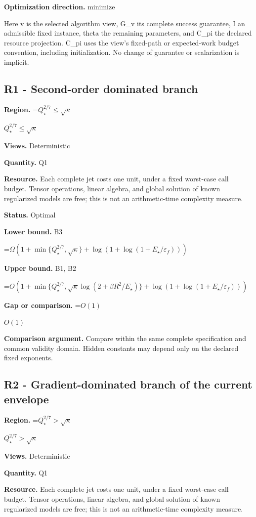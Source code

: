 \documentclass[10pt,a4paper]{article}
\newcommand{\AtlasMath}[1]{\par\begingroup\centering\setbox0=\hbox{$\displaystyle #1$}\ifdim\wd0>1.4\linewidth\typeout{ATLAS WIDE FORMULA: \the\wd0}\fi\ifdim\wd0>\linewidth\resizebox{\linewidth}{!}{\box0}\else\box0\fi\par\endgroup}
\newcommand{\AtlasInlineMath}[1]{\begingroup\setbox0=\hbox{$#1$}\ifdim\wd0>.4\linewidth\endgroup\AtlasMath{#1}\else\endgroup$#1$\fi}
\begin{document}
\textbf{Optimization direction.} minimize

Here v is the selected algorithm view, G\_v its complete success guarantee, I an admissible fixed instance, theta the remaining parameters, and C\_pi the declared resource projection. C\_pi uses the view's fixed-path or expected-work budget convention, including initialization. No change of guarantee or scalarization is implicit.

\subsection{R1 - Second-order dominated branch}
\textbf{Region.} \AtlasInlineMath{Q_\star^{2/7}\le\sqrt\kappa}

\textbf{Views.} Deterministic

\textbf{Quantity.} Q1

\textbf{Resource.} Each complete jet costs one unit, under a fixed worst-case call budget. Tensor operations, linear algebra, and global solution of known regularized models are free; this is not an arithmetic-time complexity measure.

\textbf{Status.} Optimal

\textbf{Lower bound.} B3

\AtlasMath{\Omega(1+\min\{Q_\star^{2/7},\sqrt\kappa\}+\log(1+\log(1+E_\star/\varepsilon_f)))}
\textbf{Upper bound.} B1, B2

\AtlasMath{O(1+\min\{Q_\star^{2/7},\sqrt\kappa\log(2+\beta R^2/E_\star)\}+\log(1+\log(1+E_\star/\varepsilon_f)))}
\textbf{Gap or comparison.} \AtlasInlineMath{O(1)}

\textbf{Comparison argument.} Compare within the same complete specification and common validity domain. Hidden constants may depend only on the declared fixed exponents.

\subsection{R2 - Gradient-dominated branch of the current envelope}
\textbf{Region.} \AtlasInlineMath{Q_\star^{2/7}>\sqrt\kappa}

\textbf{Views.} Deterministic

\textbf{Quantity.} Q1

\textbf{Resource.} Each complete jet costs one unit, under a fixed worst-case call budget. Tensor operations, linear algebra, and global solution of known regularized models are free; this is not an arithmetic-time complexity measure.
\end{document}
